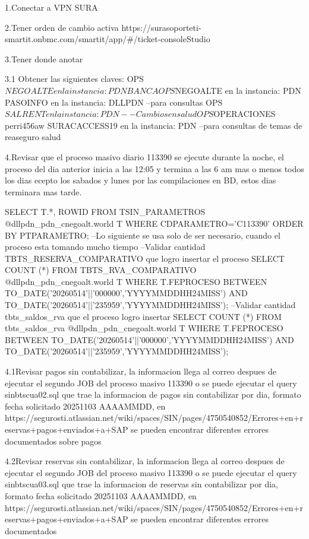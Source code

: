 1.Conectar a VPN SURA 

2.Tener orden de cambio activa
https://surasoporteti-smartit.onbmc.com/smartit/app/#/ticket-consoleStudio

3.Tener donde anotar

3.1 Obtener las siguientes claves:
OPS$NEGOALTE en la instancia: PDNBANCA 
OPS$NEGOALTE en la instancia: PDN 
PASOINFO en la instancia: DLLPDN --para consultas
OPS$SALRENT en la instancia: PDN --Cambios en salud
OPS$OPERACIONES perri456aw 
SURACACCESS19 en la instancia: PDN --para consultas de temas de reaseguro salud

4.Revisar que el proceso masivo diario 113390 se ejecute durante la noche, el proceso del dia anterior inicia a las 12:05 y termina a las 6 am mas o menos todos los dias ecepto los sabados y lunes por las compilaciones en BD, estos dias terminara mas tarde.

SELECT T.*, ROWID FROM TSIN_PARAMETROS @dllpdn_pdn_cnegoalt.world T WHERE CDPARAMETRO='C113390' ORDER BY PTPARAMETRO;
--Lo siguiente se usa solo de ser necesario, cuando el proceso esta tomando mucho tiempo
--Validar cantidad TBTS_RESERVA_COMPARATIVO que logro insertar el proceso
SELECT COUNT (*)
  FROM TBTS_RVA_COMPARATIVO @dllpdn_pdn_cnegoalt.world T
  WHERE T.FEPROCESO BETWEEN  TO_DATE('20260514'||'000000','YYYYMMDDHH24MISS')
AND TO_DATE('20260514'||'235959','YYYYMMDDHH24MISS');    
--Validar cantidad tbts_saldos_rva que el proceso logro insertar
SELECT COUNT (*)
  FROM tbts_saldos_rva @dllpdn_pdn_cnegoalt.world T
  WHERE T.FEPROCESO BETWEEN  TO_DATE('20260514'||'000000','YYYYMMDDHH24MISS')
AND TO_DATE('20260514'||'235959','YYYYMMDDHH24MISS');    

4.1Revisar pagos sin contabilizar, la informacion llega al correo despues de ejecutar el segundo JOB del proceso masivo 113390 o se puede ejecutar el query sinbtscua02.sql que trae la informacion de pagos sin contabilizar por dia, formato fecha solicitado 20251103 AAAAMMDD, en https://segurosti.atlassian.net/wiki/spaces/SIN/pages/4750540852/Errores+en+reservas+pagos+enviados+a+SAP
se pueden encontrar diferentes errores documentados sobre pagos

4.2Revisar reservas sin contabilizar, la informacion llega al correo despues de ejecutar el segundo JOB del proceso masivo 113390 o se puede ejecutar el query sinbtscua03.sql que trae la informacion de reservas sin contabilizar por dia, formato fecha solicitado 20251103 AAAAMMDD, en https://segurosti.atlassian.net/wiki/spaces/SIN/pages/4750540852/Errores+en+reservas+pagos+enviados+a+SAP
se pueden encontrar diferentes errores documentados

